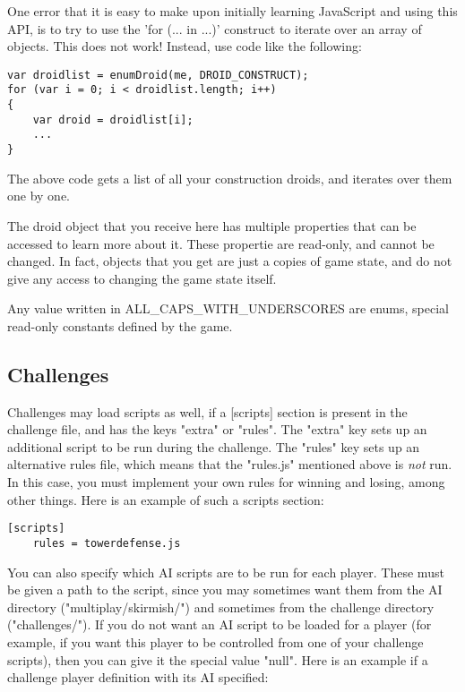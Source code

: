 \documentclass[12pt]{article}
\begin{document}
One error that it is easy to make upon initially learning JavaScript and using this API, is to try to use
the 'for (... in ...)' construct to iterate over an array of objects. This does not work! Instead, use code
like the following:

\begin{lstlisting}
var droidlist = enumDroid(me, DROID_CONSTRUCT);
for (var i = 0; i < droidlist.length; i++)
{
	var droid = droidlist[i];
	...
}
\end{lstlisting}

The above code gets a list of all your construction droids, and iterates over them one by one.

The droid object that you receive here has multiple properties that can be accessed to learn more about it. 
These propertie are read-only, and cannot be changed. In fact, objects that you get are just a copies of 
game state, and do not give any access to changing the game state itself.

Any value written in ALL_CAPS_WITH_UNDERSCORES are enums, special read-only constants defined by the
game.

\subsection{Challenges}

Challenges may load scripts as well, if a [scripts] section is present in the challenge file, and has the keys 
"extra" or "rules". The "extra" key sets up an additional script to be run during the challenge. The "rules"
key sets up an alternative rules file, which means that the "rules.js" mentioned above is \emph{not} run. In
this case, you must implement your own rules for winning and losing, among other things. Here is an example
of such a scripts section:

\begin{lstlisting}[]
	[scripts]
	rules = towerdefense.js
\end{lstlisting}

You can also specify which AI scripts are to be run for each player. These must be given a path to the script,
since you may sometimes want them from the AI directory ("multiplay/skirmish/") and sometimes from the challenge
directory ("challenges/"). If you do not want an AI script to be loaded for a player (for example, if you want 
this player to be controlled from one of your challenge scripts), then you can give it the special value "null". 
Here is an example if a challenge player definition with its AI specified:
\end{document}
